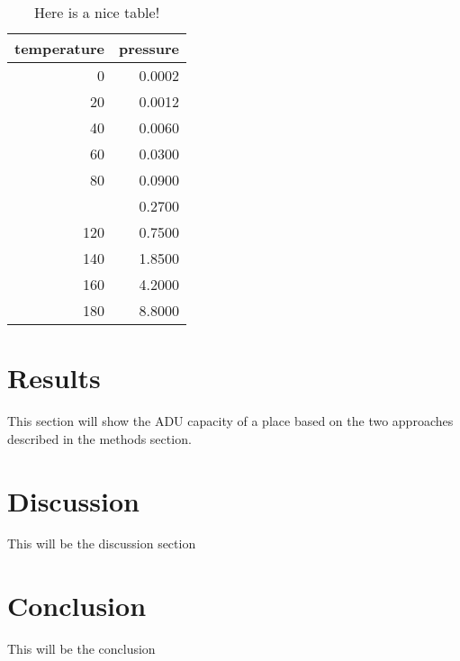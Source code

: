 \documentclass[,]{sagej}
\begin{document}
\begin{table}

\caption{\label{tab:nice-tab}Here is a nice table!}
\centering
\begin{tabular}[t]{rr}
\toprule
temperature & pressure\\
\midrule
0 & 0.0002\\
20 & 0.0012\\
40 & 0.0060\\
60 & 0.0300\\
80 & 0.0900\\
\addlinespace
100 & 0.2700\\
120 & 0.7500\\
140 & 1.8500\\
160 & 4.2000\\
180 & 8.8000\\
\bottomrule
\end{tabular}
\end{table}

\hypertarget{results}{%
\section{Results}\label{results}}

This section will show the ADU capacity of a place based on the two approaches
described in the methods section.

\hypertarget{discussion}{%
\section{Discussion}\label{discussion}}

This will be the discussion section

\hypertarget{conclusion}{%
\section{Conclusion}\label{conclusion}}

This will be the conclusion



\end{document}
